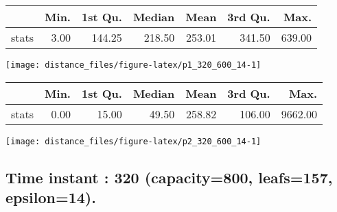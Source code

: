 \documentclass[
  9pt,
  landscape]{article}
\begin{document}
\begin{minipage}{0.5\textwidth} 
\centering 
\begin{tabular}{rrrrrrr}
  \hline
 & Min. & 1st Qu. & Median & Mean & 3rd Qu. & Max. \\ 
  \hline
stats & 3.00 & 144.25 & 218.50 & 253.01 & 341.50 & 639.00 \\ 
   \hline
\end{tabular}
\vspace{0.5cm} 


\texttt{[image: distance\_files/figure-latex/p1\_320\_600\_14-1]} 

\end{minipage} 
\begin{minipage}{0.5\textwidth} 
\centering 
\begin{tabular}{rrrrrrr}
  \hline
 & Min. & 1st Qu. & Median & Mean & 3rd Qu. & Max. \\ 
  \hline
stats & 0.00 & 15.00 & 49.50 & 258.82 & 106.00 & 9662.00 \\ 
   \hline
\end{tabular}
\vspace{0.5cm} 


\texttt{[image: distance\_files/figure-latex/p2\_320\_600\_14-1]} 

\end{minipage}

\pagebreak

\hypertarget{time-instant-320-capacity800-leafs157-epsilon14.}{%
\subsection{Time instant : 320 (capacity=800, leafs=157,
epsilon=14).}\label{time-instant-320-capacity800-leafs157-epsilon14.}}
\end{document}
